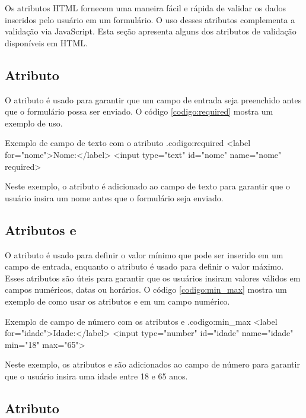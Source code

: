 Os atributos HTML fornecem uma maneira fácil e rápida de validar os dados inseridos pelo usuário em um formulário. O uso desses atributos complementa a validação via JavaScript. Esta seção apresenta alguns dos atributos de validação disponíveis em HTML.

\subsection{Atributo }

O atributo  é usado para garantir que um campo de entrada seja preenchido antes que o formulário possa ser enviado. O código \ref{codigo:required} mostra um exemplo de uso.

\begin{htmlcode}{Exemplo de campo de texto com o atributo .}{codigo:required}
<label for="nome">Nome:</label>
<input type="text" id="nome" name="nome" required>
\end{htmlcode}

Neste exemplo, o atributo  é adicionado ao campo de texto para garantir que o usuário insira um nome antes que o formulário seja enviado.

\subsection{Atributos  e }

O atributo  é usado para definir o valor mínimo que pode ser inserido em um campo de entrada, enquanto o atributo  é usado para definir o valor máximo. Esses atributos são úteis para garantir que os usuários insiram valores válidos em campos numéricos, datas ou horários. O código \ref{codigo:min_max} mostra um exemplo de como usar os atributos  e  em um campo numérico.

\begin{htmlcode}{Exemplo de campo de número com os atributos  e .}{codigo:min_max}
<label for="idade">Idade:</label>
<input type="number" id="idade" name="idade" min="18" max="65">
\end{htmlcode}

Neste exemplo, os atributos  e  são adicionados ao campo de número para garantir que o usuário insira uma idade entre 18 e 65 anos.

\subsection{Atributo }

